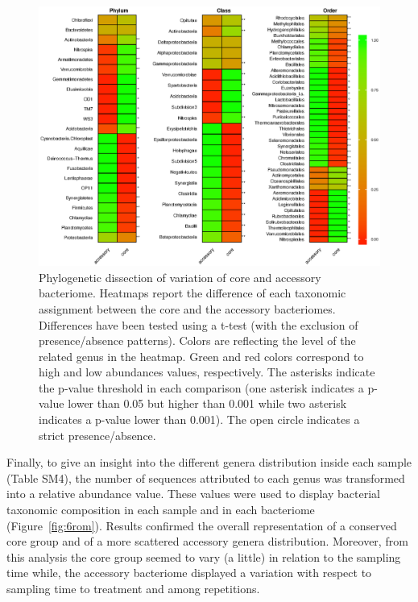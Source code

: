 \begin{figure}[!tb]
	\centering
	\includegraphics[width=1\textwidth]{./figures/Chapter_3/Fig5.eps}
  	\caption{Phylogenetic dissection of variation of core and accessory bacteriome. Heatmaps report the difference of each taxonomic assignment between the core and the accessory bacteriomes. Differences have been tested using a t-test (with the exclusion of presence/absence patterns). Colors are reflecting the level of the related genus in the heatmap. Green and red colors correspond to high and low abundances values, respectively. The asterisks indicate the p-value threshold in each comparison (one asterisk indicates a p-value lower than 0.05 but higher than 0.001 while two asterisk indicates a p-value lower than 0.001). The open circle indicates a strict presence/absence. \label{fig:5rom}}
\end{figure}
Finally, to give an insight into the different genera distribution inside each sample (Table SM4), the number of sequences attributed to each genus was transformed into a relative abundance value. These values were used to display bacterial taxonomic composition in each sample and in each bacteriome (Figure~\ref{fig:6rom}). Results confirmed the overall representation of a conserved core group and of a more scattered accessory genera distribution. Moreover, from this analysis the core group seemed to vary (a little) in relation to the sampling time while, the accessory bacteriome displayed a variation with respect to sampling time to treatment and among repetitions.\\
